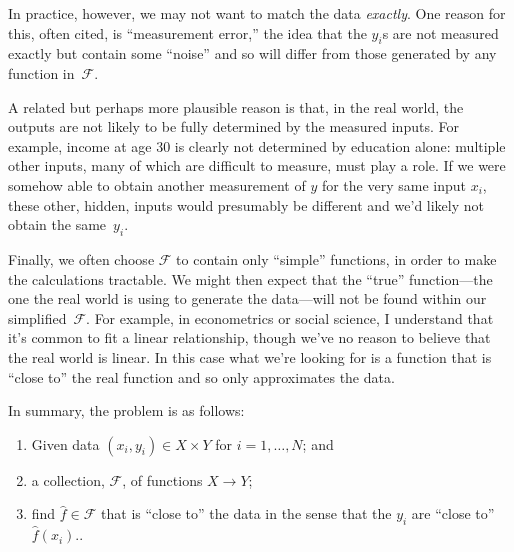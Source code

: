 \documentclass[10pt, a4paper]{article}
\begin{document}
In practice, however, we may not want to match the data
\emph{exactly}. One reason for this, often cited, is “measurement
error,” the idea that the $y_i$s are not measured exactly but contain
some “noise” and so will differ from those generated by any function
in~$\mathcal{F}$.

A related but perhaps more plausible reason is that, in the real
world, the outputs are not likely to be fully determined by the
measured inputs. For example, income at age 30 is clearly not
determined by education alone: multiple other inputs, many of which
are difficult to measure, must play a role. If we were somehow able to
obtain another measurement of $y$ for the very same input $x_i$, these
other, hidden, inputs would presumably be different and we'd likely
not obtain the same~$y_i$.

Finally, we often choose $\mathcal{F}$ to contain only “simple” functions, in
order to make the calculations tractable. We might then expect that
the “true” function---the one the real world is using to generate the
data---will not be found within our simplified~$\mathcal{F}$. For example, in
econometrics or social science, I understand that it's common to fit a
linear relationship, though we've no reason to believe that the real
world is linear. In this case what we're looking for is a function
that is “close to” the real function and so only approximates the
data.

In summary, the problem is as follows:
\begin{enumerate}
\item Given data $(x_i, y_i) \in X\times Y$ for $i=1,\dots,N$; and
\item a collection, $\mathcal{F}$, of functions $X\to Y$;
\item find $\hat{f}\in\mathcal{F}$ that is “close to” the data in the sense that
  the $y_i$ are “close to”~$\hat{f}(x_i)$..
\end{enumerate}
\end{document}
